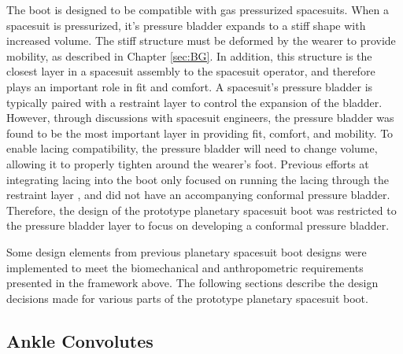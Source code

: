 \documentclass[defaultstyle,11pt]{thesis}
\begin{document}
The boot is designed to be compatible with gas pressurized spacesuits.
When a spacesuit is pressurized, it's pressure bladder expands to a stiff shape with increased volume.
The stiff structure must be deformed by the wearer to provide mobility, as described in Chapter \ref{sec:BG}.
In addition, this structure is the closest layer in a spacesuit assembly to the spacesuit operator, and therefore plays an important role in fit and comfort.
A spacesuit's pressure bladder is typically paired with a restraint layer to control the expansion of the bladder\citep{Harris2001}.
However, through discussions with spacesuit engineers, the pressure bladder was found to be the most important layer in providing fit, comfort, and mobility.
To enable lacing compatibility, the pressure bladder will need to change volume, allowing it to properly tighten around the wearer's foot.
Previous efforts at integrating lacing into the boot only focused on running the lacing through the restraint layer \citep{Graziosi2016}, and did not have an accompanying conformal pressure bladder.
Therefore, the design of the prototype planetary spacesuit boot was restricted to the pressure bladder layer to focus on developing a conformal pressure bladder.

Some design elements from previous planetary spacesuit boot designs were implemented to meet the biomechanical and anthropometric requirements presented in the framework above.
The following sections describe the design decisions made for various parts of the prototype planetary spacesuit boot.

\hypertarget{ankle-convolutes}{%
\subsection{Ankle Convolutes}\label{ankle-convolutes}}
\end{document}
